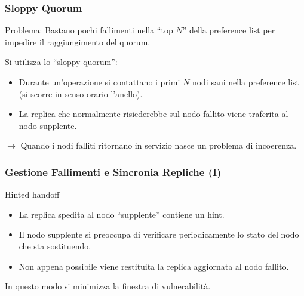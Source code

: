 \begin{frame}
  \frametitle{Sloppy Quorum}
  \begin{block}{Problema:}
    Bastano pochi fallimenti nella ``top $N$'' della preference list per impedire il raggiungimento del quorum.    
  \end{block}
  \begin{block}{Si utilizza lo ``sloppy quorum'':}
  \begin{itemize}
  \item Durante un'operazione si contattano i primi $N$ nodi \alert{sani} nella preference list (si scorre in senso orario l'anello).
  \item La replica che normalmente risiederebbe sul nodo fallito viene traferita al nodo supplente.
  \end{itemize}
  \end{block}
  $\longrightarrow$ Quando i nodi falliti ritornano in servizio nasce un problema di incoerenza. 
\end{frame}


\begin{frame}
  \frametitle{Gestione Fallimenti e Sincronia Repliche (I)}
  \begin{block}{Hinted handoff}
  \begin{itemize}
  \item La replica spedita al nodo ``supplente'' contiene un \alert{hint}.
  \item Il nodo supplente si preoccupa di verificare periodicamente lo stato del nodo che sta sostituendo.
  \item Non appena possibile viene restituita la replica aggiornata al nodo fallito.
  \end{itemize}
  In questo modo si minimizza la finestra di vulnerabilità.
  \end{block}
\end{frame}

